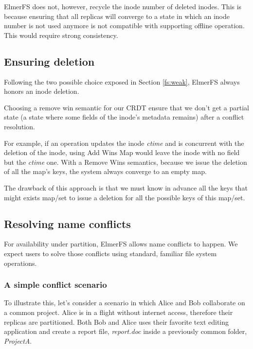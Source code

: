 \documentclass[sigconf, 10pt]{acmart}
\begin{document}
ElmerFS does not, however, recycle the inode number of deleted inodes.
This is because ensuring that all replicas will converge to a state in which an inode number is not used anymore is not compatible with supporting offline operation. This would require strong consistency.

\subsection{Ensuring deletion}

\label{sec:deletion}
Following the two possible choice exposed in Section \ref{fs:weak}, ElmerFS always honors
an inode deletion.

Choosing a remove win semantic for our CRDT ensure that we don't get a partial
state (a state where some fields of the inode's metadata remains) after a conflict resolution.

For example, if an operation updates the inode \textit{ctime} and is concurrent with the deletion of the inode,
using Add Wins Map would leave the inode with no field but the \textit{ctime} one. With a Remove Wins semantics, because
we issue the deletion of all the map's keys, the system always converge to an empty map.

The drawback of this approach is that we must know in advance all the keys that might exists map/set to issue a deletion for all the possible keys of this map/set.

\subsection{Resolving name conflicts}

For availability under partition, ElmerFS allows name conflicts to happen. We expect users to solve
those conflicts using standard, familiar file system operations.

\subsubsection{A simple conflict scenario}
To illustrate this, let's consider a scenario in which Alice and Bob collaborate on a common project.
Alice is in a flight without internet access, therefore their replicas are
partitioned.
Both Bob and Alice uses their favorite text editing application and create a report file, \textit{report.doc} inside a previously common folder, \textit{ProjectA}.
\end{document}

